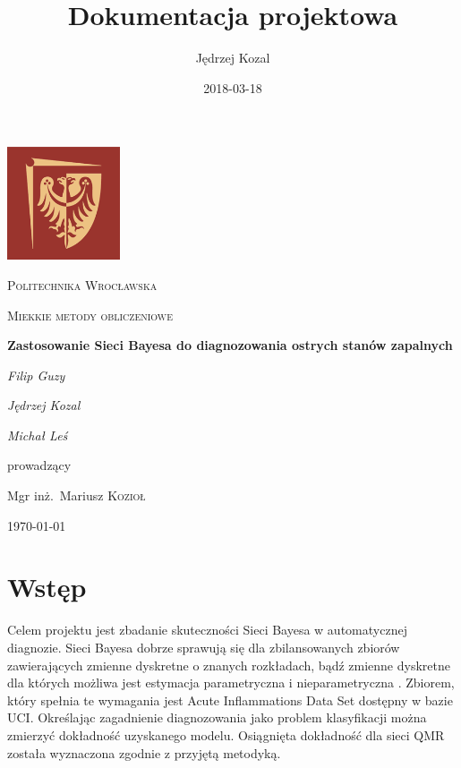 \documentclass{article}
\title{Dokumentacja projektowa}
\date{2018-03-18}
\author{Jędrzej Kozal}
\begin{document}
\begin{titlepage}
	\centering
	\includegraphics[width=0.25\textwidth]{logo_pol_wroclaw.png}\par\vspace{1cm}
	{\scshape\LARGE Politechnika Wrocławska \par}
	\vspace{1cm}
	{\scshape\Large Miekkie metody obliczeniowe\par}
	\vspace{1.5cm}
	{\huge\bfseries Zastosowanie Sieci Bayesa do diagnozowania ostrych stanów zapalnych \par}
	\vspace{2cm}
	{\Large\itshape Filip Guzy\par}
	{\Large\itshape Jędrzej Kozal\par}
	{\Large\itshape Michał Leś\par}

	\vfill
	prowadzący\par
	Mgr inż.~Mariusz \textsc{Kozioł}

	\vfill

	{\large \today\par}
\end{titlepage}

\tableofcontents
\newpage


\section{Wstęp}

Celem projektu jest zbadanie skuteczności Sieci Bayesa w automatycznej diagnozie. Sieci Bayesa dobrze sprawują się dla zbilansowanych zbiorów zawierających zmienne dyskretne o znanych rozkładach, bądź zmienne dyskretne dla których możliwa jest estymacja parametryczna i nieparametryczna \cite{paper}. Zbiorem, który spełnia te wymagania jest Acute Inflammations Data Set dostępny w bazie UCI. Określając zagadnienie diagnozowania jako problem klasyfikacji można zmierzyć dokładność uzyskanego modelu. Osiągnięta dokładność dla sieci QMR została wyznaczona zgodnie z przyjętą metodyką.
\end{document}
